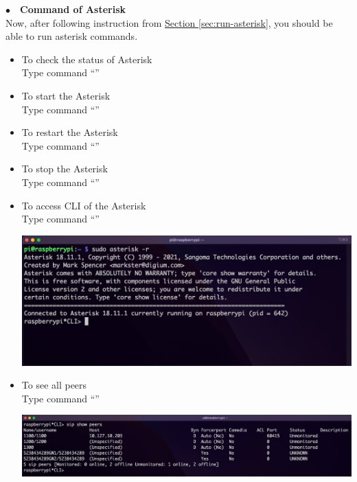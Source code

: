 \noindent$\bullet$~~\textbf{Command of Asterisk}	\label{sec:command-asterisk}\\
	Now, after following instruction from \hyperref[sec:run-asterisk]{Section \ref{sec:run-asterisk}}, you should be able to run asterisk commands.
	\begin{itemize}
		\item To check the status of Asterisk\\
		Type command ``{\selectfont{sudo service asterisk status}}''
		\item To start the Asterisk\\
		Type command ``{\selectfont{sudo service asterisk start}}''
		\item To restart the Asterisk\\
		Type command ``{\selectfont{sudo service asterisk restart}}''
		\item To stop the Asterisk\\
		Type command ``{\selectfont{sudo service asterisk stop}}''
		\item To access CLI of the Asterisk\\
		Type command ``{\selectfont{sudo asterisk -r}}''\\
			\begin{minipage}{\textwidth}
				\vspace{2mm}
				\includegraphics[scale=0.21]{Images/raspberry_pi/asterisk_install/CLI.png}
				\vspace{2mm}
			\end{minipage}
		\item To see all peers\\
		Type command ``{\selectfont{sip show peers}}''\\
			\begin{minipage}{\textwidth}
				\vspace{2mm}
				\includegraphics[scale=0.15]{Images/raspberry_pi/asterisk_install/show_peers.png}

\end{minipage}
\end{itemize}

